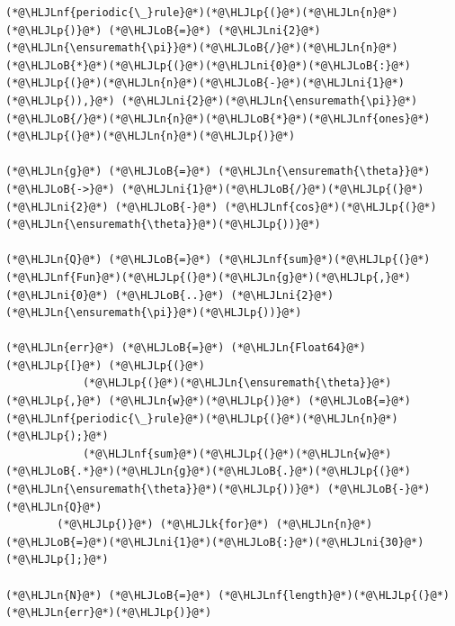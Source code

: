 \documentclass[12pt,a4paper]{article}
\newcommand{\HLJLk}[1]{\textcolor[RGB]{148,91,176}{\textbf{#1}}}
\newcommand{\HLJLn}[1]{#1}
\newcommand{\HLJLnf}[1]{\textcolor[RGB]{66,102,213}{#1}}
\newcommand{\HLJLni}[1]{\textcolor[RGB]{59,151,46}{#1}}
\newcommand{\HLJLoB}[1]{\textcolor[RGB]{102,102,102}{\textbf{#1}}}
\newcommand{\HLJLp}[1]{#1}
\begin{document}
\begin{lstlisting}
(*@\HLJLnf{periodic{\_}rule}@*)(*@\HLJLp{(}@*)(*@\HLJLn{n}@*)(*@\HLJLp{)}@*) (*@\HLJLoB{=}@*) (*@\HLJLni{2}@*)(*@\HLJLn{\ensuremath{\pi}}@*)(*@\HLJLoB{/}@*)(*@\HLJLn{n}@*)(*@\HLJLoB{*}@*)(*@\HLJLp{(}@*)(*@\HLJLni{0}@*)(*@\HLJLoB{:}@*)(*@\HLJLp{(}@*)(*@\HLJLn{n}@*)(*@\HLJLoB{-}@*)(*@\HLJLni{1}@*)(*@\HLJLp{)),}@*) (*@\HLJLni{2}@*)(*@\HLJLn{\ensuremath{\pi}}@*)(*@\HLJLoB{/}@*)(*@\HLJLn{n}@*)(*@\HLJLoB{*}@*)(*@\HLJLnf{ones}@*)(*@\HLJLp{(}@*)(*@\HLJLn{n}@*)(*@\HLJLp{)}@*)

(*@\HLJLn{g}@*) (*@\HLJLoB{=}@*) (*@\HLJLn{\ensuremath{\theta}}@*) (*@\HLJLoB{->}@*) (*@\HLJLni{1}@*)(*@\HLJLoB{/}@*)(*@\HLJLp{(}@*)(*@\HLJLni{2}@*) (*@\HLJLoB{-}@*) (*@\HLJLnf{cos}@*)(*@\HLJLp{(}@*)(*@\HLJLn{\ensuremath{\theta}}@*)(*@\HLJLp{))}@*)

(*@\HLJLn{Q}@*) (*@\HLJLoB{=}@*) (*@\HLJLnf{sum}@*)(*@\HLJLp{(}@*)(*@\HLJLnf{Fun}@*)(*@\HLJLp{(}@*)(*@\HLJLn{g}@*)(*@\HLJLp{,}@*) (*@\HLJLni{0}@*) (*@\HLJLoB{..}@*) (*@\HLJLni{2}@*)(*@\HLJLn{\ensuremath{\pi}}@*)(*@\HLJLp{))}@*)

(*@\HLJLn{err}@*) (*@\HLJLoB{=}@*) (*@\HLJLn{Float64}@*)(*@\HLJLp{[}@*) (*@\HLJLp{(}@*)
            (*@\HLJLp{(}@*)(*@\HLJLn{\ensuremath{\theta}}@*)(*@\HLJLp{,}@*) (*@\HLJLn{w}@*)(*@\HLJLp{)}@*) (*@\HLJLoB{=}@*) (*@\HLJLnf{periodic{\_}rule}@*)(*@\HLJLp{(}@*)(*@\HLJLn{n}@*)(*@\HLJLp{);}@*)
            (*@\HLJLnf{sum}@*)(*@\HLJLp{(}@*)(*@\HLJLn{w}@*)(*@\HLJLoB{.*}@*)(*@\HLJLn{g}@*)(*@\HLJLoB{.}@*)(*@\HLJLp{(}@*)(*@\HLJLn{\ensuremath{\theta}}@*)(*@\HLJLp{))}@*) (*@\HLJLoB{-}@*) (*@\HLJLn{Q}@*)
        (*@\HLJLp{)}@*) (*@\HLJLk{for}@*) (*@\HLJLn{n}@*)(*@\HLJLoB{=}@*)(*@\HLJLni{1}@*)(*@\HLJLoB{:}@*)(*@\HLJLni{30}@*)(*@\HLJLp{];}@*)

(*@\HLJLn{N}@*) (*@\HLJLoB{=}@*) (*@\HLJLnf{length}@*)(*@\HLJLp{(}@*)(*@\HLJLn{err}@*)(*@\HLJLp{)}@*)


\end{lstlisting}
\end{document}

